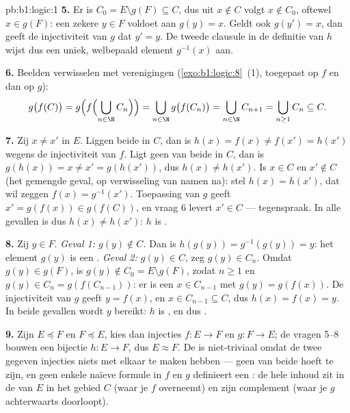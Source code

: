 \begin{solution}{pb:b1:logic:1}
\textbf{5.} Er is $C_0 = E \setminus g(F) \subseteq C$, dus uit $x \notin
C$ volgt $x \notin C_0$, oftewel $x \in g(F)$: een zekere $y \in F$
voldoet aan $g(y) = x$. Geldt ook $g(y') = x$, dan geeft de injectiviteit
van $g$ dat $y' = y$. De tweede clausule in de definitie van $h$ wijst
dus een uniek, welbepaald element $g^{-1}(x)$ aan.

\textbf{6.} Beelden verwisselen met verenigingen
(\cref{exo:b1:logic:8}~(1), toegepast op $f$ en dan op $g$):
\[
g\bigl(f(C)\bigr)
= g\Bigl(f\Bigl(\bigcup_{n \in \N} C_n\Bigr)\Bigr)
= \bigcup_{n \in \N} g\bigl(f(C_n)\bigr)
= \bigcup_{n \in \N} C_{n+1}
= \bigcup_{n \geq 1} C_n \subseteq C .
\]

\textbf{7.} Zij $x \neq x'$ in $E$. Liggen beide in $C$, dan is $h(x) =
f(x) \neq f(x') = h(x')$ wegens de injectiviteit van $f$. Ligt geen van
beide in $C$, dan is $g(h(x)) = x \neq x' = g(h(x'))$, dus $h(x) \neq
h(x')$. Is $x \in C$ en $x' \notin C$ (het gemengde geval, op verwisseling
van namen na): stel $h(x) = h(x')$, dat wil zeggen $f(x) = g^{-1}(x')$.
Toepassing van $g$ geeft $x' = g(f(x)) \in g(f(C))$, en vraag 6 levert
$x' \in C$ --- tegenspraak. In alle gevallen is dus $h(x) \neq h(x')$:
$h$ is .

\textbf{8.} Zij $y \in F$. \emph{Geval 1: $g(y) \notin C$.} Dan is
$h(g(y)) = g^{-1}(g(y)) = y$: het element $g(y)$ is een .
\emph{Geval 2: $g(y) \in C$}, zeg $g(y) \in C_n$. Omdat $g(y) \in g(F)$,
is $g(y) \notin C_0 = E \setminus g(F)$, zodat $n \geq 1$ en $g(y) \in
C_n = g(f(C_{n-1}))$: er is een $x \in C_{n-1}$ met $g(y) = g(f(x))$. De
injectiviteit van $g$ geeft $y = f(x)$, en $x \in C_{n-1} \subseteq C$,
dus $h(x) = f(x) = y$. In beide gevallen wordt $y$ bereikt: $h$ is
, en dus .

\textbf{9.} Zijn $E \preceq F$ en $F \preceq E$, kies dan injecties $f
\colon E \to F$ en $g \colon F \to E$; de vragen 5--8 bouwen een bijectie
$h \colon E \to F$, dus $E \approx F$. De  is niet-triviaal
omdat de twee gegeven injecties niets met elkaar te maken hebben ---
geen van beide hoeft  te zijn, en geen enkele naïeve formule in
$f$ en $g$ definieert een : de hele inhoud zit in de 
van $E$ in het gebied $C$ (waar je $f$ overneemt) en zijn complement
(waar je $g$ achterwaarts doorloopt).


\end{solution}
